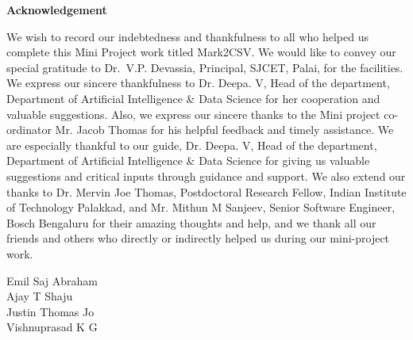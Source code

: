 \thispagestyle{empty}
\begin{center}
  \vspace*{1cm}
  \textbf{\large Acknowledgement}
\end{center}
We wish to record our indebtedness and thankfulness to all who helped us complete this Mini Project work titled Mark2CSV. We would like to convey our special gratitude to Dr.~V.P. Devassia, Principal, SJCET, Palai, for the facilities. We express our sincere thankfulness to Dr. Deepa. V, Head of the department, Department of Artificial Intelligence \& Data Science for her cooperation and valuable suggestions. Also, we express our sincere thanks to the Mini project co-ordinator Mr. Jacob Thomas for his helpful feedback and timely assistance.
We are especially thankful to our guide, Dr. Deepa. V, Head of the department, Department of Artificial Intelligence \& Data Science for giving us valuable suggestions and critical inputs through guidance and support. We also extend our thanks to Dr. Mervin Joe Thomas, Postdoctoral Research Fellow, Indian Institute of Technology Palakkad, and Mr. Mithun M Sanjeev, Senior Software Engineer, Bosch Bengaluru for their amazing thoughts and help, and we thank all our friends and others who directly or indirectly helped us during our mini-project work.
 \\
\begin{flushright}
Emil Saj Abraham \\
Ajay T Shaju \\
Justin Thomas Jo \\
Vishnuprasad K G
\end{flushright}







\newpage %

